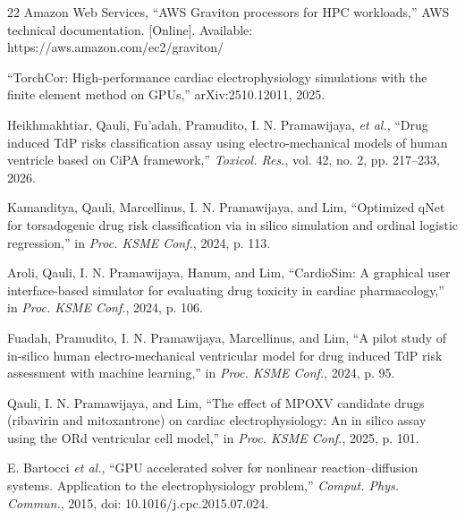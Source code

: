 \documentclass[journal]{IEEEtran}
\begin{document}
\begin{thebibliography}{22}
Amazon Web Services, ``AWS Graviton processors for HPC workloads,'' AWS technical documentation. [Online]. Available: https://aws.amazon.com/ec2/graviton/

``TorchCor: High-performance cardiac electrophysiology simulations with the finite element method on GPUs,'' arXiv:2510.12011, 2025.

Heikhmakhtiar, Qauli, Fu'adah, Pramudito, I. N. Pramawijaya, \emph{et al.}, ``Drug induced TdP risks classification assay using electro-mechanical models of human ventricle based on CiPA framework,'' \emph{Toxicol. Res.}, vol. 42, no. 2, pp. 217--233, 2026.

Kamanditya, Qauli, Marcellinus, I. N. Pramawijaya, and Lim, ``Optimized qNet for torsadogenic drug risk classification via in silico simulation and ordinal logistic regression,'' in \emph{Proc. KSME Conf.}, 2024, p. 113.

Aroli, Qauli, I. N. Pramawijaya, Hanum, and Lim, ``CardioSim: A graphical user interface-based simulator for evaluating drug toxicity in cardiac pharmacology,'' in \emph{Proc. KSME Conf.}, 2024, p. 106.

Fuadah, Pramudito, I. N. Pramawijaya, Marcellinus, and Lim, ``A pilot study of in-silico human electro-mechanical ventricular model for drug induced TdP risk assessment with machine learning,'' in \emph{Proc. KSME Conf.}, 2024, p. 95.

Qauli, I. N. Pramawijaya, and Lim, ``The effect of MPOXV candidate drugs (ribavirin and mitoxantrone) on cardiac electrophysiology: An in silico assay using the ORd ventricular cell model,'' in \emph{Proc. KSME Conf.}, 2025, p. 101.

E. Bartocci \emph{et al.}, ``GPU accelerated solver for nonlinear reaction--diffusion systems. Application to the electrophysiology problem,'' \emph{Comput. Phys. Commun.}, 2015, doi: 10.1016/j.cpc.2015.07.024.


\end{thebibliography}
\end{document}
